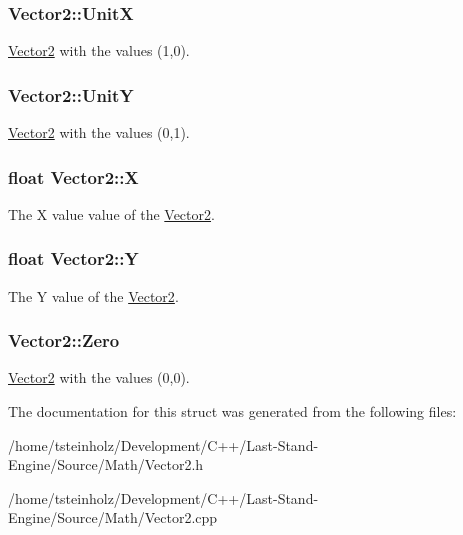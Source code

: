 \subsubsection[{Unit\+X}]{ Vector2\+::\+Unit\+X\hspace{0.3cm}{\ttfamily [static]}}\label{structVector2_a4327b6f08dfb7c40163797f5f20d93ba}
\hyperlink{structVector2}{Vector2} with the values (1,0). \hypertarget{structVector2_a89e4cdd468e6e87b6dd512c04b1a6431}{}
\subsubsection[{Unit\+Y}]{ Vector2\+::\+Unit\+Y\hspace{0.3cm}{\ttfamily [static]}}\label{structVector2_a89e4cdd468e6e87b6dd512c04b1a6431}
\hyperlink{structVector2}{Vector2} with the values (0,1). \hypertarget{structVector2_ae01506fa3d0fb79821bee7445a0c7baf}{}
\subsubsection[{X}]{\setlength{\rightskip}{0pt plus 5cm}float Vector2\+::\+X}\label{structVector2_ae01506fa3d0fb79821bee7445a0c7baf}
The X value value of the \hyperlink{structVector2}{Vector2}. \hypertarget{structVector2_ab79dce0b924a27a639e0a3cb82b20cec}{}
\subsubsection[{Y}]{\setlength{\rightskip}{0pt plus 5cm}float Vector2\+::\+Y}\label{structVector2_ab79dce0b924a27a639e0a3cb82b20cec}
The Y value of the \hyperlink{structVector2}{Vector2}. \hypertarget{structVector2_a3eb421c40e7bd2653c01a84fb7e55240}{}
\subsubsection[{Zero}]{ Vector2\+::\+Zero\hspace{0.3cm}{\ttfamily [static]}}\label{structVector2_a3eb421c40e7bd2653c01a84fb7e55240}
\hyperlink{structVector2}{Vector2} with the values (0,0). 

The documentation for this struct was generated from the following files\+:\begin{DoxyCompactItemize}
\item 
/home/tsteinholz/\+Development/\+C++/\+Last-\/\+Stand-\/\+Engine/\+Source/\+Math/Vector2.\+h\item 
/home/tsteinholz/\+Development/\+C++/\+Last-\/\+Stand-\/\+Engine/\+Source/\+Math/Vector2.\+cpp\end{DoxyCompactItemize}
